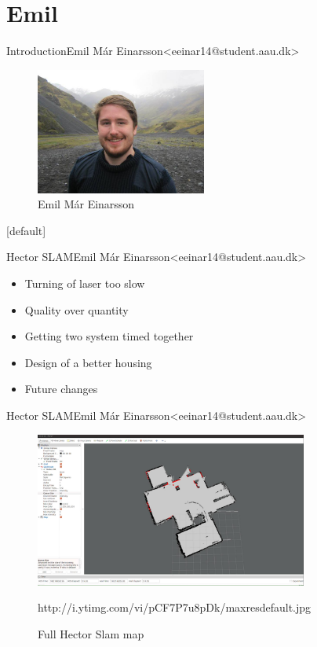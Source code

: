 \section{Emil}


\begin{frame}{Introduction}{Emil Már Einarsson\newline<eeinar14@student.aau.dk>}
	\begin{figure}[h!]
    	\includegraphics[width=0.5\textwidth]{images/emil.jpg}
    	\caption{Emil Már Einarsson}
		\centering    		
	\end{figure}
\end{frame}

[default]

\begin{frame}{Hector SLAM}{Emil Már Einarsson\newline<eeinar14@student.aau.dk>}
  \begin{itemize}
  	\item Turning of laser too slow
  	\item Quality over quantity
  	\item Getting two system timed together
  	\item Design of a better housing
  	\item Future changes
  \end{itemize}
\end{frame}

\begin{frame}{Hector SLAM}{Emil Már Einarsson\newline<eeinar14@student.aau.dk>}
	\begin{figure}[h!]
    	\includegraphics[width=0.8\textwidth]{images/hectorslam.jpg}
    	\caption{Full Hector Slam map}
    	\tiny{http://i.ytimg.com/vi/pCF7P7u8pDk/maxresdefault.jpg}
		\centering    		
	\end{figure}
\end{frame}

